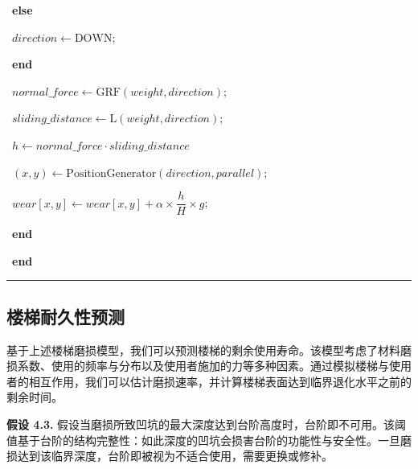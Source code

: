 \documentclass[11pt,a4paper]{ctexart}
\begin{document}
\noindent{}\ \hspace*{2.4em}\textbf{else}\par
\noindent{}\ \hspace*{3.6em}$direction \leftarrow \mathrm{DOWN}$;\par
\noindent{}\ \hspace*{2.4em}\textbf{end}\par
\noindent{}\ \hspace*{2.4em}$normal\_force \leftarrow \mathrm{GRF}(weight,direction)$;\par
\noindent{}\ \hspace*{2.4em}$sliding\_distance \leftarrow \mathrm{L}(weight,direction)$;\par
\noindent{}\ \hspace*{2.4em}$h \leftarrow normal\_force \cdot sliding\_distance$\par
\noindent\makebox[2.2em][r]{}\ \hspace*{2.4em}$(x,y) \leftarrow \mathrm{PositionGenerator}(direction,parallel)$;\par
\noindent{}\ \hspace*{2.4em}$wear[x,y] \leftarrow wear[x,y] + \alpha\times\dfrac{h}{H}\times g$;\par
\noindent{}\ \hspace*{1.2em}\textbf{end}\par
\noindent{}\ \textbf{end}\par
\vspace{2pt}
\noindent\rule{\linewidth}{0.5pt}\par
\endgroup

\subsection{楼梯耐久性预测}

基于上述楼梯磨损模型，我们可以预测楼梯的剩余使用寿命。该模型考虑了材料磨损系数、使用的频率与分布以及使用者施加的力等多种因素。通过模拟楼梯与使用者的相互作用，我们可以估计磨损速率，并计算楼梯表面达到临界退化水平之前的剩余时间。

\noindent\textbf{假设 4.3.} 假设当磨损所致凹坑的最大深度达到台阶高度时，台阶即不可用。该阈值基于台阶的结构完整性：如此深度的凹坑会损害台阶的功能性与安全性。一旦磨损达到该临界深度，台阶即被视为不适合使用，需要更换或修补。
\end{document}
